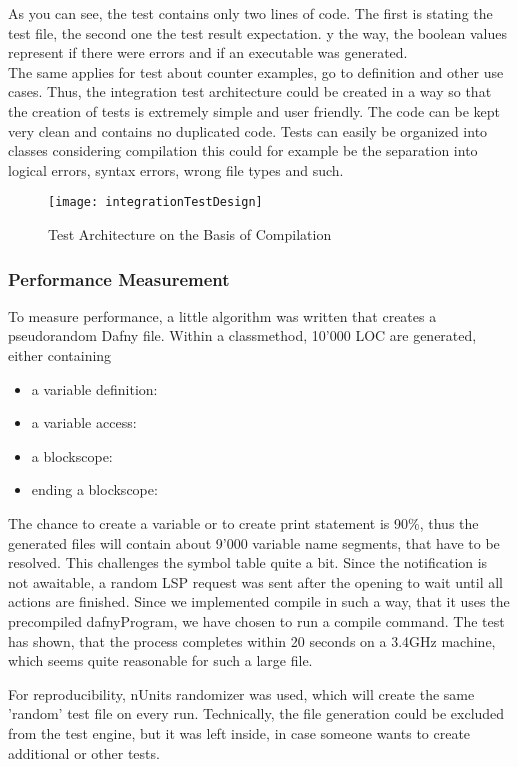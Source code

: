 As you can see, the test contains only two lines of code.
The first is stating the test file, the second one the test result expectation.
 y the way, the boolean values represent if there were errors and if an executable was generated.\\
The same applies for test about counter examples, go to definition and other use cases.
Thus, the integration test architecture could be created in a way so that the creation of tests is extremely simple and user friendly.
The code can be kept very clean and contains no duplicated code.
Tests can easily be organized into classes \textendash{} considering compilation this could for example be the separation into logical errors, syntax errors, wrong file types and such.

\begin{figure}[H]
    \centering
    \texttt{[image: integrationTestDesign]}
    \caption{Test Architecture on the Basis of Compilation}
    \label{fig:testArchitecture}
\end{figure}

\subsubsection{Performance Measurement}
To measure performance, a little algorithm was written that creates a pseudorandom Dafny file.
Within a classmethod, 10'000 LOC are generated, either containing
\begin{itemize}
    \item a variable definition: 
    \item a variable access: 
    \item a blockscope: 
    \item ending a blockscope: \code{\}}
\end{itemize}
The chance to create a variable or to create print statement is 90\%, thus the generated files will contain about 9'000 variable name segments, that have to be resolved.
This challenges the symbol table quite a bit.
Since the  notification is not awaitable, a random LSP request was sent after the opening to wait until all actions are finished.
Since we implemented compile in such a way, that it uses the precompiled dafnyProgram, we have chosen to run a compile command.
The test has shown, that the process completes within 20 seconds on a 3.4GHz machine, which seems quite reasonable for such a large file.

For reproducibility, nUnits randomizer was used, which will create the same 'random' test file on every run.
Technically, the file generation could be excluded from the test engine, but it was left inside, in case someone wants to create additional or other tests.